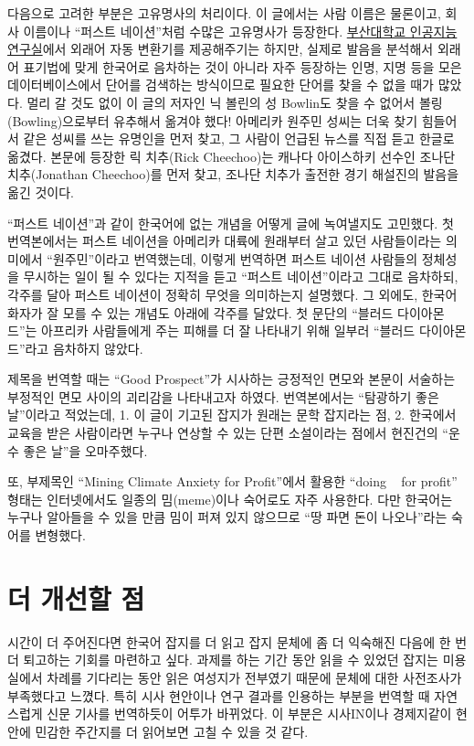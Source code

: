 \documentclass{translation}
\begin{document}
다음으로 고려한 부분은 고유명사의 처리이다.
이 글에서는 사람 이름은 물론이고, 회사 이름이나 ``퍼스트 네이션''처럼 수많은 고유명사가 등장한다.
\href{http://loanword.cs.pusan.ac.kr/}{부산대학교 인공지능연구실}에서 외래어 자동 변환기를 제공해주기는 하지만, 실제로 발음을 분석해서 외래어 표기법에 맞게 한국어로 음차하는 것이 아니라 자주 등장하는 인명, 지명 등을 모은 데이터베이스에서 단어를 검색하는 방식이므로 필요한 단어를 찾을 수 없을 때가 많았다.
멀리 갈 것도 없이 이 글의 저자인 닉 볼린의 성 Bowlin도 찾을 수 없어서 볼링(Bowling)으로부터 유추해서 옮겨야 했다!
아메리카 원주민 성씨는 더욱 찾기 힘들어서 같은 성씨를 쓰는 유명인을 먼저 찾고, 그 사람이 언급된 뉴스를 직접 듣고 한글로 옮겼다.
본문에 등장한 릭 치추(Rick Cheechoo)는 캐나다 아이스하키 선수인 조나단 치추(Jonathan Cheechoo)를 먼저 찾고, 조나단 치추가 출전한 경기 해설진의 발음을 옮긴 것이다.

``퍼스트 네이션''과 같이 한국어에 없는 개념을 어떻게 글에 녹여낼지도 고민했다.
첫 번역본에서는 퍼스트 네이션을 아메리카 대륙에 원래부터 살고 있던 사람들이라는 의미에서 ``원주민''이라고 번역했는데, 이렇게 번역하면 퍼스트 네이션 사람들의 정체성을 무시하는 일이 될 수 있다는 지적을 듣고 ``퍼스트 네이션''이라고 그대로 음차하되, 각주를 달아 퍼스트 네이션이 정확히 무엇을 의미하는지 설명했다.
그 외에도, 한국어 화자가 잘 모를 수 있는 개념도 아래에 각주를 달았다.
첫 문단의 ``블러드 다이아몬드''는 아프리카 사람들에게 주는 피해를 더 잘 나타내기 위해 일부러 ``블러드 다이아몬드''라고 음차하지 않았다.

제목을 번역할 때는 ``Good Prospect''가 시사하는 긍정적인 면모와 본문이 서술하는 부정적인 면모 사이의 괴리감을 나타내고자 하였다.
번역본에서는 ``탐광하기 좋은 날''이라고 적었는데, 1. 이 글이 기고된 잡지가 원래는 문학 잡지라는 점, 2. 한국에서 교육을 받은 사람이라면 누구나 연상할 수 있는 단편 소설이라는 점에서 현진건의 ``운수 좋은 날''을 오마주했다.

또, 부제목인 ``Mining Climate Anxiety for Profit''에서 활용한 ``doing ~ for profit'' 형태는 인터넷에서도 일종의 밈(meme)이나 숙어로도 자주 사용한다.
다만 한국어는 누구나 알아들을 수 있을 만큼 밈이 퍼져 있지 않으므로 ``땅 파면 돈이 나오나''라는 숙어를 변형했다.

\section{더 개선할 점}

시간이 더 주어진다면 한국어 잡지를 더 읽고 잡지 문체에 좀 더 익숙해진 다음에 한 번 더 퇴고하는 기회를 마련하고 싶다.
과제를 하는 기간 동안 읽을 수 있었던 잡지는 미용실에서 차례를 기다리는 동안 읽은 여성지가 전부였기 때문에 문체에 대한 사전조사가 부족했다고 느꼈다.
특히 시사 현안이나 연구 결과를 인용하는 부분을 번역할 때 자연스럽게 신문 기사를 번역하듯이 어투가 바뀌었다.
이 부분은 시사IN이나 경제지같이 현안에 민감한 주간지를 더 읽어보면 고칠 수 있을 것 같다.
\end{document}
